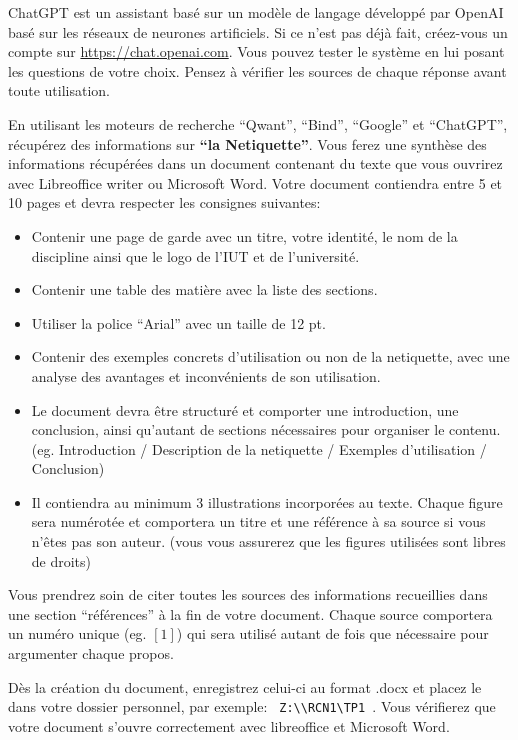 \documentclass[a4paper, 9pt]{article}
\begin{document}
\clearpage

\exost ChatGPT est un assistant bas\'e sur un mod\`ele de langage d\'evelopp\'e par OpenAI 
bas\'e sur les r\'eseaux de neurones artificiels.
Si ce n'est pas d\'ej\`a fait, cr\'eez-vous un compte sur \url{https://chat.openai.com}. 
Vous pouvez tester le syst\`eme en lui posant les questions de votre choix. 
Pensez \`a v\'erifier les sources de chaque r\'eponse avant toute utilisation.


\exost En utilisant les moteurs de recherche ``Qwant'', ``Bind'', ``Google'' et ``ChatGPT'',  r\'ecup\'erez des informations sur {\bf ``la 
Netiquette''}. Vous ferez une synth\`ese des informations r\'ecup\'er\'ees dans un document contenant du texte que vous ouvrirez
avec Libreoffice writer ou Microsoft Word. Votre document contiendra entre 5 et 10 pages et devra respecter les consignes suivantes:

\begin{itemize}
 \item Contenir une page de garde avec un titre, votre identit\'e, le nom de la discipline ainsi que le logo de l'IUT et de l'universit\'e.
 \item Contenir une table des mati\`ere avec la liste des sections.
 \item Utiliser la police ``Arial'' avec un taille de 12 pt.
 \item Contenir des exemples concrets d'utilisation ou non de la netiquette, avec une analyse des avantages et inconv\'enients de son utilisation.
 \item Le document devra \^etre structur\'e et comporter une introduction, une conclusion, ainsi qu'autant de sections n\'ecessaires pour organiser le contenu.
 (eg. Introduction / Description de la netiquette / Exemples d'utilisation / Conclusion)
 \item Il contiendra au minimum 3 illustrations incorpor\'ees au texte. Chaque figure sera num\'erot\'ee et comportera un titre et une r\'ef\'erence \`a sa source
 si vous n'\^etes pas son auteur. (vous vous assurerez que les figures utilis\'ees sont libres de droits)
\end{itemize}

Vous prendrez soin de citer toutes les sources des informations recueillies dans une section ``r\'ef\'erences'' \`a la fin de votre document.
Chaque source comportera un num\'ero unique (eg. $[1]$) qui sera utilis\'e autant de fois que n\'ecessaire pour argumenter chaque propos.

D\`es la cr\'eation du document, enregistrez celui-ci au format .docx et placez le dans votre dossier personnel, par exemple: \verb? Z:\\RCN1\TP1 ?.
Vous v\'erifierez que votre document s'ouvre correctement avec libreoffice et Microsoft Word.
\end{document}
